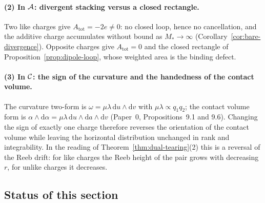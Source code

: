 \paragraph{(2) In $\mathcal{A}$: divergent stacking versus a closed rectangle.}
Two like charges give $A_{\mathrm{tot}}=-2e\ne0$: no closed loop, hence no
cancellation, and the additive charge accumulates without bound as
$M_*\to\infty$ (Corollary~\ref{cor:bare-divergence}).  Opposite charges give
$A_{\mathrm{tot}}=0$ and the closed rectangle of
Proposition~\ref{prop:dipole-loop}, whose weighted area is the binding defect.

\paragraph{(3) In $\mathcal{C}$: the sign of the curvature and the handedness of the
contact volume.}
The curvature two-form is $\omega=\mu\lambda\,\mathrm du\wedge\mathrm dv$ with
$\mu\lambda\propto q_1q_2$; the contact volume form is
$\alpha\wedge\mathrm d\alpha=\mu\lambda\,\mathrm du\wedge\mathrm da\wedge
\mathrm dv$ (Paper~0, Propositions~9.1 and 9.6).  Changing the sign of exactly
one charge therefore reverses the orientation of the contact volume while
leaving the horizontal distribution unchanged in rank and integrability.  In the
reading of Theorem~\ref{thm:dual-tearing}(2) this is a reversal of the Reeb
drift: for like charges the Reeb height of the pair grows with decreasing $r$,
for unlike charges it decreases.

\subsection{Status of this section}

